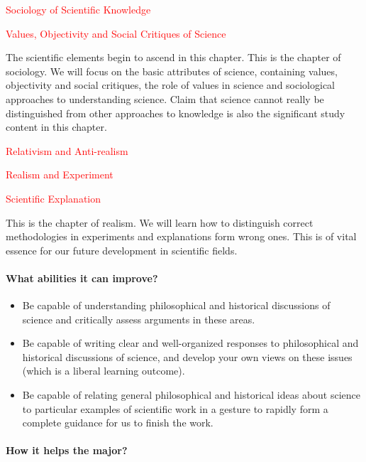 \documentclass[12pt, a4paper]{article}
\begin{document}
\centerline {\textcolor{red}{Sociology of Scientific Knowledge}}

\centerline {\textcolor{red}{Values, Objectivity and Social Critiques of Science}}

The scientific elements begin to ascend in this chapter. This is the chapter of sociology. We will focus on the basic attributes of science, containing values, objectivity and social critiques, the role of values in science and sociological approaches to understanding science. Claim that science cannot really be distinguished from other approaches to knowledge is also the significant study content in this chapter. 

\centerline {\textcolor{red}{Relativism and Anti-realism}}

\centerline {\textcolor{red}{Realism and Experiment}}

\centerline {\textcolor{red}{Scientific Explanation}}

This is the chapter of realism. We will learn how to distinguish correct methodologies in experiments and explanations form wrong ones. This is of vital essence for our future development in scientific fields. 

	\paragraph {What abilities it can improve?}

	\begin{itemize}
	  \item Be capable of understanding philosophical and historical discussions of science and critically assess arguments in these areas.
	  \item Be capable of writing clear and well-organized responses to philosophical and historical discussions of science, and develop your own views on these issues (which is a liberal learning outcome).
	  \item Be capable of relating general philosophical and historical ideas about science to particular examples of scientific work in a gesture to rapidly form a complete guidance for us to finish the work.
	\end{itemize}

	\paragraph {How it helps the major?}
\end{document}
